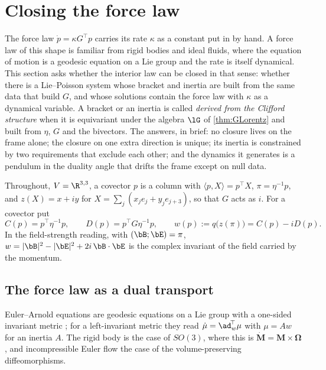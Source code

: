 \section{Closing the force law}
\label{sec:closure}

The force law $\dot p=\kappa G^{\!\top}p$ carries its rate $\kappa$ as a constant put in by hand. A force law of this shape is familiar from
rigid bodies and ideal fluids, where the equation of motion is a geodesic equation on a Lie group and the rate is itself dynamical. This
section asks whether the interior law can be closed in that sense: whether there is a Lie--Poisson system whose bracket and inertia are built
from the same data that build $G$, and whose solutions contain the force law with $\kappa$ as a dynamical variable. A bracket or an inertia is
called \emph{derived from the Clifford structure} when it is equivariant under the algebra $\lG$ of \cref{thm:GLorentz} and built from
$\eta$, $G$ and the bivectors. The answers, in brief: no closure lives on the frame alone; the closure on one extra direction is unique; its
inertia is constrained by two requirements that exclude each other; and the dynamics it generates is a pendulum in the duality angle that
drifts the frame except on null data.

Throughout, $V=\R^{3,3}$, a covector $p$ is a column with $\langle p,X\rangle=p^{\!\top}X$, $\pi=\eta^{-1}p$, and $z(X)=x+iy$ for
$X=\sum_j(x_je_j+y_je_{j+3})$, so that $G$ acts as $i$. For a covector put
\begin{equation}
\label{eq:wdef}
C(p)=p^{\!\top}\eta^{-1}p,\qquad D(p)=p^{\!\top}G\eta^{-1}p,\qquad w(p):=q\bigl(z(\pi)\bigr)=C(p)-iD(p).
\end{equation}
In the field-strength reading, with $(\bB;\bE)=\pi$, $w=|\bB|^2-|\bE|^2+2i\,\bB\cdot\bE$ is the complex invariant of the field carried by the
momentum.

\subsection{The force law as a dual transport}

Euler--Arnold equations are geodesic equations on a Lie group with a one-sided invariant metric \cite{Arnold66,ArnoldKhesin98}; for a
left-invariant metric they read $\dot\mu=\ad_w^{\!\top}\mu$ with $\mu=Aw$ for an inertia $A$. The rigid body is the case of $SO(3)$, where this is
$\dot{\mathbf M}=\mathbf M\times\boldsymbol\Omega$, and incompressible Euler flow the case of the volume-preserving diffeomorphisms.

